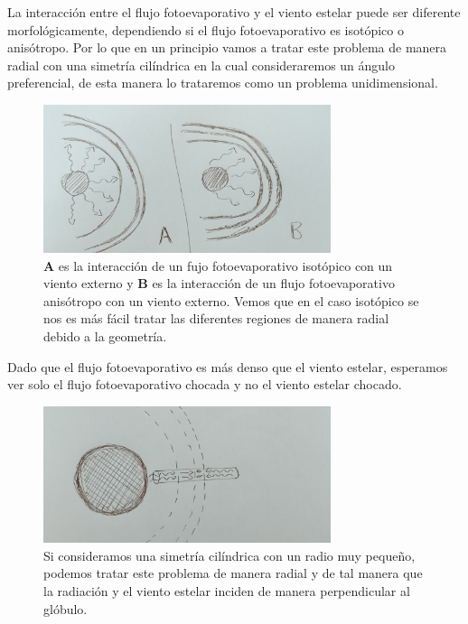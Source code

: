 \documentclass{book}
\begin{document}
La interacción entre el flujo fotoevaporativo y el viento estelar puede ser diferente morfológicamente, dependiendo si el flujo fotoevaporativo es isotópico o anisótropo. Por lo que en un principio vamos a tratar este problema de manera radial con una simetría cilíndrica en la cual consideraremos un ángulo preferencial, de esta manera lo trataremos como un problema unidimensional.

\begin{figure}[h]
    \centering
    \includegraphics[width=0.75\textwidth]{Chp2_iso&ans.jpg}
    \caption{\textbf{A} es la interacción de un fujo fotoevaporativo isotópico con un viento externo y \textbf{B} es la interacción de un flujo fotoevaporativo anisótropo con un viento externo. Vemos que en el caso isotópico se nos es más fácil tratar las diferentes regiones de manera radial debido a la geometría.}
    \label{fig:isotyaniso}
\end{figure}

Dado que el flujo fotoevaporativo es más denso que el viento estelar, esperamos ver solo el flujo fotoevaporativo chocada y no el viento estelar chocado.

\begin{figure}[h]
    \centering
    \includegraphics[width=0.75\textwidth]{Chp2_cilinders.jpg}
    \caption{Si consideramos una simetría cilíndrica con un radio muy pequeño, podemos tratar este problema de manera radial y de tal manera que la radiación y el viento estelar inciden de manera perpendicular al glóbulo.}
    \label{fig:cilinders}
\end{figure}
\end{document}
